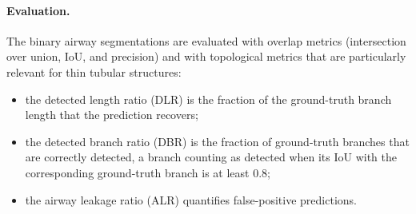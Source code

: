\paragraph{Evaluation.}  %
The binary airway segmentations are evaluated with overlap metrics (intersection over union,
IoU, and precision) and with topological metrics that are particularly
relevant for thin tubular structures:
\begin{itemize}  %
  \item the detected length ratio (DLR) is the fraction of the ground-truth
        branch length that the prediction recovers;
  \item the detected branch ratio (DBR) is the fraction of ground-truth
        branches that are correctly detected, a branch counting as detected
        when its IoU with the corresponding ground-truth branch is at least 0.8;
  \item the airway leakage ratio (ALR) quantifies false-positive predictions.
\end{itemize}

